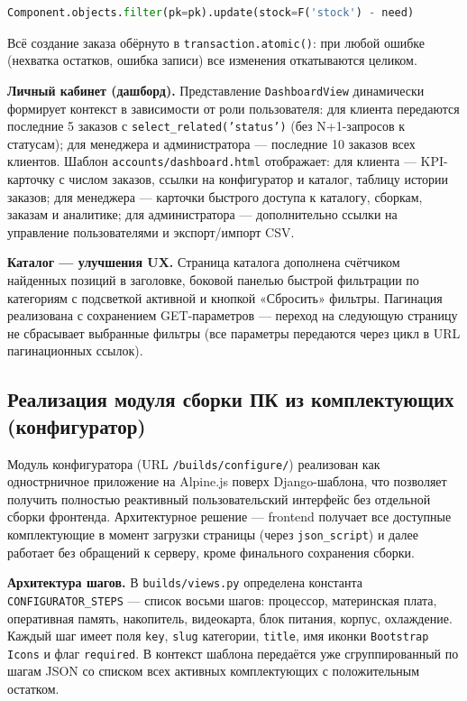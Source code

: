 \begin{lstlisting}[language=Python, caption={Атомарное списание остатков через F()-выражение}]
Component.objects.filter(pk=pk).update(stock=F('stock') - need)
\end{lstlisting}

Всё создание заказа обёрнуто в \texttt{transaction.atomic()}: при любой ошибке (нехватка остатков, ошибка записи) все изменения откатываются целиком.

\textbf{Личный кабинет (дашборд).} Представление \texttt{DashboardView} динамически формирует контекст в зависимости от роли пользователя: для клиента передаются последние 5 заказов с \texttt{select\_related('status')} (без N+1-запросов к статусам); для менеджера и администратора --- последние 10 заказов всех клиентов. Шаблон \texttt{accounts/dashboard.html} отображает: для клиента --- KPI-карточку с числом заказов, ссылки на конфигуратор и каталог, таблицу истории заказов; для менеджера --- карточки быстрого доступа к каталогу, сборкам, заказам и аналитике; для администратора --- дополнительно ссылки на управление пользователями и экспорт/импорт CSV.

\textbf{Каталог --- улучшения UX.} Страница каталога дополнена счётчиком найденных позиций в заголовке, боковой панелью быстрой фильтрации по категориям с подсветкой активной и кнопкой «Сбросить» фильтры. Пагинация реализована с сохранением GET-параметров --- переход на следующую страницу не сбрасывает выбранные фильтры (все параметры передаются через цикл в URL пагинационных ссылок).

\subsection{Реализация модуля сборки ПК из комплектующих (конфигуратор)}

Модуль конфигуратора (URL \texttt{/builds/configure/}) реализован как однострничное приложение на Alpine.js поверх Django-шаблона, что позволяет получить полностью реактивный пользовательский интерфейс без отдельной сборки фронтенда. Архитектурное решение --- frontend получает все доступные комплектующие в момент загрузки страницы (через \texttt{json\_script}) и далее работает без обращений к серверу, кроме финального сохранения сборки.

\textbf{Архитектура шагов.} В \texttt{builds/views.py} определена константа \texttt{CONFIGURATOR\_STEPS} --- список восьми шагов: процессор, материнская плата, оперативная память, накопитель, видеокарта, блок питания, корпус, охлаждение. Каждый шаг имеет поля \texttt{key}, \texttt{slug} категории, \texttt{title}, имя иконки \texttt{Bootstrap Icons} и флаг \texttt{required}. В контекст шаблона передаётся уже сгруппированный по шагам JSON со списком всех активных комплектующих с положительным остатком.

